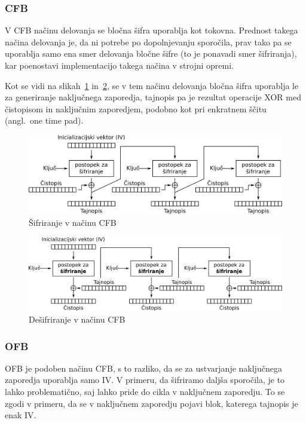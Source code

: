 \documentclass[12pt,a4paper,openany,tikz]{book}
\theoremstyle{plain}
\theoremstyle{definition}
\begin{document}
\subsubsection{CFB}
\label{subs:CFB}

V \gls{CFB} načinu delovanja se bločna šifra uporablja kot tokovna. Prednost takega načina delovanja je, da ni potrebe po dopolnjevanju sporočila, prav tako pa se uporablja samo ena smer delovanja bločne šifre (to je ponavadi smer šifriranja), kar poenostavi implementacijo takega načina v strojni opremi.

Kot se vidi na slikah~\ref{fig:cfbenc} in~\ref{fig:cfbdec}, se v tem načinu delovanja bločna šifra uporablja le za generiranje naključnega zaporedja, tajnopis pa je rezultat operacije \rm{XOR} med čistopisom in naključnim zaporedjem, podobno kot pri enkratnem ščitu (angl.\ one time pad).

\begin{figure}[ht!]
  \centering
    \includegraphics[width=\textwidth]{images/CFB_encryption}
    \caption{Šifriranje v načinu CFB}
\label{fig:cfbenc}
\end{figure}

\begin{figure}[ht!]
  \centering
    \includegraphics[width=\textwidth]{images/CFB_decryption}
    \caption{Dešifriranje v načinu CFB}
\label{fig:cfbdec}
\end{figure}

\subsubsection{OFB}
\label{subs:OFB}

\gls{OFB} je podoben načinu \gls{CFB}, s to razliko, da se za ustvarjanje naključnega zaporedja uporablja samo \gls{IV}. V primeru, da šifriramo daljša sporočila, je to lahko problematično, saj lahko pride do cikla v naključnem zaporedju. To se zgodi v primeru, da se v naključnem zaporedju pojavi blok, katerega tajnopis je enak IV.\@
\end{document}
